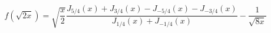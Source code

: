 $$f(\sqrt{2x})=\sqrt{\frac x2}\frac{J_{5/4}(x)+J_{3/4}(x)-J_{-5/4}(x)-J_{-3/4}(x)}{J_{1/4}(x)+J_{-1/4}(x)}-\frac 1{\sqrt{8x}}$$
